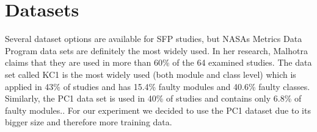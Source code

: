 \section{Datasets}
Several dataset options are available for SFP studies, but NASAs Metrics Data Program data sets are definitely the most widely used. In her research, Malhotra\cite{malhotra2015systematic} claims that they are used in more than 60\% of the 64 examined studies. The data set called KC1 is the most widely used (both module and class level) which is applied in 43\% of studies and
has 15.4\% faulty modules and 40.6\% faulty classes. Similarly, the PC1 data set is used in 40\% of studies and contains only 6.8\% of faulty modules.\cite[p.~17]{malhotra2015systematic}. For our experiment we decided to use the PC1 dataset due to its bigger size and therefore more training data. 